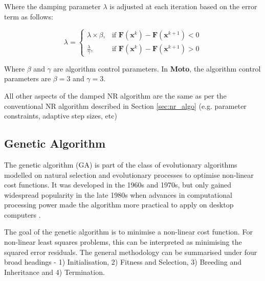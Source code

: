 \documentclass{article}
\begin{document}
Where the damping parameter $\lambda$ is adjusted at each iteration based on the error term as follows:

\begin{equation}
\lambda =
\begin{cases}
\lambda \times \beta, & \text{if } \mathbf{F}(\boldsymbol{x}^{k}) - \mathbf{F}(\boldsymbol{x}^{k+1}) < 0 \\
\frac{\lambda}{\gamma}, & \text{if } \mathbf{F}(\boldsymbol{x}^{k}) - \mathbf{F}(\boldsymbol{x}^{k+1}) > 0
\end{cases}
\end{equation}

Where $\beta$ and $\gamma$ are algorithm control parameters. In \textbf{Moto}, the algorithm control parameters are $\beta = 3$ and $\gamma = 3$.

All other aspects of the damped NR algorithm are the same as per the conventional NR algorithm described in Section \ref{sec:nr_algo} (e.g. parameter constraints, adaptive step sizes, etc)

\subsection{Genetic Algorithm}
\label{sec:genetic_algo}
The genetic algorithm (GA) is part of the class of evolutionary algorithms modelled on natural selection and evolutionary processes to optimise non-linear cost functions. It was developed in the 1960s and 1970s, but only gained widespread popularity in the late 1980s when advances in computational processing power made the algorithm more practical to apply on desktop computers \cite{haupt_1998}. 

The goal of the genetic algorithm is to minimise a non-linear cost function. For non-linear least squares problems, this can be interpreted as minimising the squared error residuals. The general methodology can be summarised under four broad headings - 1) Initialisation, 2) Fitness and Selection, 3) Breeding and Inheritance and 4) Termination.
\end{document}
